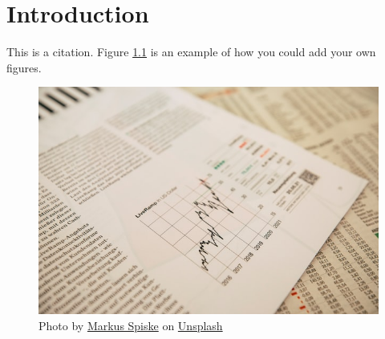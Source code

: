 \chapter{Introduction}
\label{chapter:introduction}

\blindtext This is a citation\autocite{example-article}. Figure \ref{fig:fig1a} is an example of how you could add your own figures.

\begin{figure}[H]
	\centering
	\includegraphics[width=0.6\linewidth]{figures/report}
	\caption{Photo by \href{https://unsplash.com/@markusspiske?utm_source=unsplash&utm_medium=referral&utm_content=creditCopyText}{Markus Spiske} on \href{https://unsplash.com/s/photos/report?utm_source=unsplash&utm_medium=referral&utm_content=creditCopyTextl}{Unsplash}
	}
	\label{fig:fig1a}
\end{figure}
